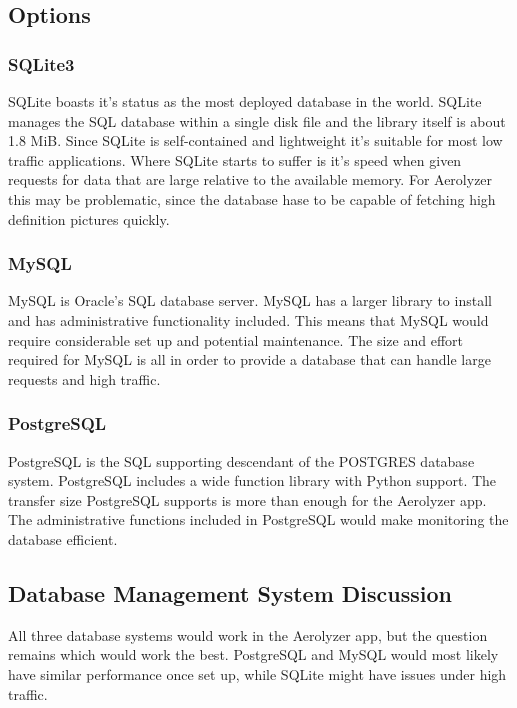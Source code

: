 \documentclass[onecolumn, draftclsnofoot,10pt, compsoc]{IEEEtran}
\begin{document}
\begin{singlespace}
\subsection{Options}
\subsubsection{SQLite3}
SQLite boasts it's status as the most deployed database in the world\cite{SQLiteAbout}.
SQLite manages the SQL database within a single disk file and the library itself is about 1.8 MiB\cite{SQLiteAbout}.
Since SQLite is self-contained and lightweight it's suitable for most low traffic applications\cite{SQLiteUse}.
Where SQLite starts to suffer is it's speed when given requests for data that are large relative to the available memory. For Aerolyzer this may be problematic, since the database hase to be capable of fetching high definition pictures quickly\cite{SQLiteAbout}.
\subsubsection{MySQL}
MySQL is Oracle's SQL database server.
MySQL has a larger library to install and has administrative functionality included.
This means that MySQL would require considerable set up and potential maintenance.
The size and effort required for MySQL is all in order to provide a database that can handle large requests and high traffic.\cite{MySQLDoc}
\subsubsection{PostgreSQL}
PostgreSQL is the SQL supporting descendant of the POSTGRES database system.
PostgreSQL includes a wide function library with Python support.
The transfer size PostgreSQL supports is more than enough for the Aerolyzer app.
The administrative functions included in PostgreSQL would make monitoring the database efficient.\cite{PostgreSQLDoc}
\subsection{Database Management System Discussion}
All three database systems would work in the Aerolyzer app, but the question remains which would work the best. PostgreSQL and MySQL would most likely have similar performance once set up, while SQLite might have issues under high traffic.

\end{singlespace}
\end{document}
